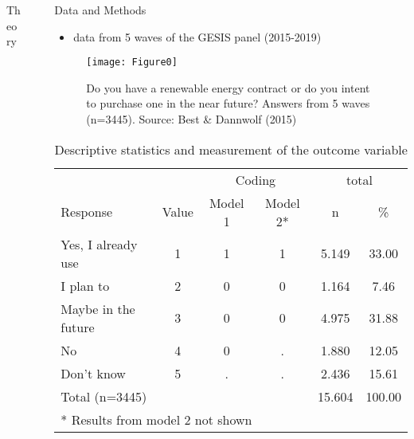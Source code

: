 \documentclass[final]{beamer}
\newlength{\sepwidth}
\newlength{\colwidth}
\newcommand{\separatorcolumn}{\begin{column}{\sepwidth}\end{column}}
\begin{document}
\begin{frame}[t]
\begin{columns}[t]
\begin{column}{\colwidth}
\begin{alertblock}{Theory}
 \end{alertblock}

\end{column}

\separatorcolumn

\begin{column}{\colwidth}

   \begin{block}{Data and Methods}
\begin{itemize}
	\item data from 5 waves of the GESIS panel (2015-2019)
\end{itemize}

 \begin{figure}
	\centering
		\texttt{[image: Figure0]}
		\caption{Do you have a renewable energy contract or do you intent to purchase one in the near future? Answers from 5 waves (n=3445). Source: Best \& Dannwolf (2015)}
	\label{fig:Figure0}
\end{figure}	

\begin{table}
	\small{
	\centering
		\caption{Descriptive statistics and measurement of the outcome variable}}
		\begin{tabular}{p{4cm}ccccc}
	\midrule
						&    &   \multicolumn{2}{c}{Coding}      &\multicolumn{2}{c}{total}\\
	Response &Value& Model 1   & Model 2*  & n         &   \%      \\ 
  \midrule
	Yes, I already use & 1& 1&1 & 5.149 &   33.00     \\[0.2cm]
	I plan to  & 2& 0&0 & 1.164 &     7.46     \\[0.2cm]
	Maybe in the future& 3& 0&0 & 4.975 &    31.88          \\[0.2cm]
	No & 4& 0&. & 1.880 &  12.05              \\[0.2cm]
	Don't know & 5& .&. & 2.436 &    15.61       \\[0.2cm]
	\midrule
	Total (n=3445)     &  &  &  & 15.604 &   100.00       \\
	\midrule
	\multicolumn{4}{l}{* Results from model 2 not shown}\\
	\end{tabular}
\end{table}


\end{block}
\end{column}
\end{columns}
\end{frame}
\end{document}

